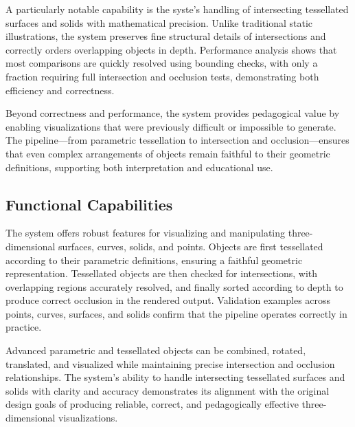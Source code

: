 A particularly notable capability is the syste's handling of intersecting 
tessellated surfaces and solids with mathematical precision. Unlike 
traditional static illustrations, the system preserves fine structural 
details of intersections and correctly orders overlapping objects in depth. 
Performance analysis shows that most comparisons are quickly resolved 
using bounding checks, with only a fraction requiring full intersection 
and occlusion tests, demonstrating both efficiency and correctness. 

Beyond correctness and performance, the system provides pedagogical value 
by enabling visualizations that were previously difficult or impossible 
to generate. The pipeline—from parametric tessellation to intersection 
and occlusion—ensures that even complex arrangements of objects remain 
faithful to their geometric definitions, supporting both interpretation 
and educational use.

\subsection{Functional Capabilities}

The system offers robust features for visualizing and manipulating 
three-dimensional surfaces, curves, solids, and points. Objects are 
first tessellated according to their parametric definitions, ensuring 
a faithful geometric representation. Tessellated objects are then 
checked for intersections, with overlapping regions accurately resolved, 
and finally sorted according to depth to produce correct occlusion in 
the rendered output. Validation examples across points, curves, surfaces, 
and solids confirm that the pipeline operates correctly in practice.

Advanced parametric and tessellated objects can be combined, rotated, 
translated, and visualized while maintaining precise intersection and 
occlusion relationships. The system's ability to handle intersecting 
tessellated surfaces and solids with clarity and accuracy demonstrates 
its alignment with the original design goals of producing reliable, 
correct, and pedagogically effective three-dimensional visualizations.


